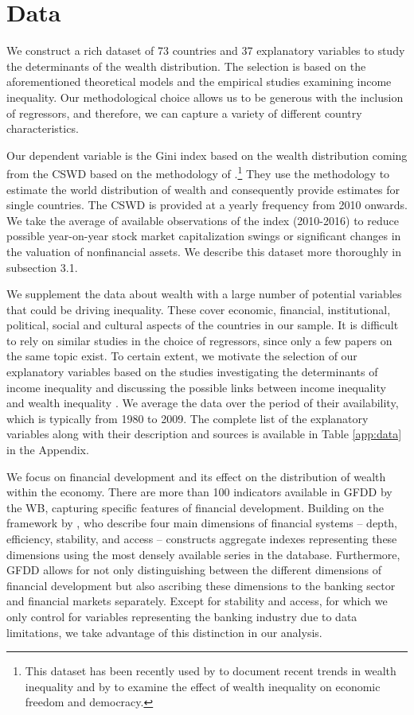 \documentclass[a4paper,11pt]{article}
\begin{document}
\section{Data}
\label{sec:data}
We construct a rich dataset of 73 countries and 37 explanatory variables to study the determinants of the wealth distribution. The selection is based on the aforementioned theoretical models and the empirical studies examining income inequality. Our methodological choice allows us to be generous with the inclusion of regressors, and therefore, we can capture a variety of different country characteristics. 

Our dependent variable is the Gini index based on the wealth distribution coming from the \ac{CSWD} based on the methodology of \citet{daviesetal2011,daviesetal2017}.\footnote{This dataset has been recently used by \citet{anand} to document recent trends in wealth inequality and by \citet{islam} to examine the effect of wealth inequality on economic freedom and democracy.} They use the methodology to estimate the world distribution of wealth and consequently provide estimates for single countries. The \ac{CSWD} is provided at a yearly frequency from 2010 onwards. We take the average of available observations of the index (2010-2016) to reduce possible year-on-year stock market capitalization swings or significant changes in the valuation of nonfinancial assets. We describe this dataset more thoroughly in subsection 3.1.

We supplement the data about wealth with a large number of potential variables that could be driving inequality. These cover economic, financial, institutional, political, social and cultural aspects of the countries in our sample. It is difficult to rely on similar studies in the choice of regressors, since only a few papers on the same topic exist. To certain extent, we motivate the selection of our explanatory variables based on the studies investigating the determinants of income inequality and discussing the possible links between income inequality and wealth inequality \citep{roine2015long,de2017finance}. We average the data over the period of their availability, which is typically from 1980 to 2009. The complete list of the explanatory variables along with their description and sources is available in Table \ref{app:data} in the Appendix.

We focus on financial development and its effect on the distribution of wealth within the economy. There are more than 100 indicators available in \ac{GFDD} by the \ac{WB}, capturing specific features of financial development. Building on the framework by \citet{Cihaketal2013}, who describe four main dimensions of financial systems -- depth, efficiency, stability, and access -- \citet{svirydzenka2016introducing} constructs aggregate indexes representing these dimensions using the most densely available series in the database. Furthermore, \ac{GFDD} allows for not only distinguishing between the different dimensions of financial development but also ascribing these dimensions to the banking sector and financial markets separately. Except for stability and access, for which we only control for variables representing the banking industry due to data limitations, we take advantage of this distinction in our analysis.
\end{document}
